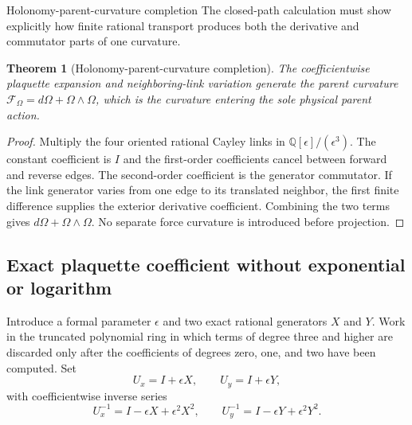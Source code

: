 \documentclass[11pt]{article}
\numberwithin{equation}{section}
\newtheorem{theorem}[definition]{Theorem}
\theoremstyle{remark}
\newcommand{\Q}{\mathbb{Q}}
\begin{document}
\begin{proofguide}{Holonomy-parent-curvature completion}
The closed-path calculation must show explicitly how finite rational transport produces both the derivative and commutator parts of one curvature.
\end{proofguide}
\begin{theorem}[Holonomy-parent-curvature completion]
The coefficientwise plaquette expansion and neighboring-link variation generate the parent curvature $\mathcal F_\Omega=d\Omega+\Omega\wedge\Omega$, which is the curvature entering the sole physical parent action.
\end{theorem}
\begin{proof}
Multiply the four oriented rational Cayley links in $\Q[\epsilon]/(\epsilon^3)$. The constant coefficient is $I$ and the first-order coefficients cancel between forward and reverse edges. The second-order coefficient is the generator commutator. If the link generator varies from one edge to its translated neighbor, the first finite difference supplies the exterior derivative coefficient. Combining the two terms gives $d\Omega+\Omega\wedge\Omega$. No separate force curvature is introduced before projection.
\end{proof}

\subsection{Exact plaquette coefficient without exponential or logarithm}
Introduce a formal parameter $\epsilon$ and two exact rational generators $X$ and $Y$.  Work in the truncated polynomial ring in which terms of degree three and higher are discarded only after the coefficients of degrees zero, one, and two have been computed.  Set
\begin{equation}
U_x=I+\epsilon X,
\qquad
U_y=I+\epsilon Y,
\end{equation}
with coefficientwise inverse series
\begin{equation}
U_x^{-1}=I-\epsilon X+\epsilon^2X^2,
\qquad
U_y^{-1}=I-\epsilon Y+\epsilon^2Y^2.
\end{equation}
\end{document}
